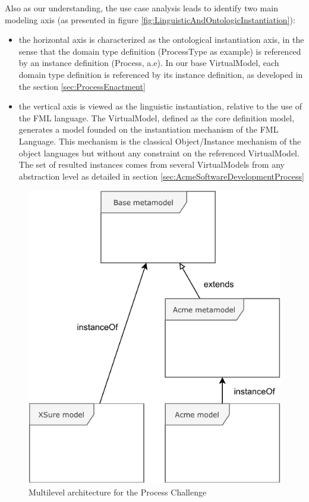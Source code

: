Also as our understanding, the use case analysis leads to identify two main modeling axis (as presented in figure \ref{fig:LinguisticAndOntologicInstantiation}):
\begin{itemize}
    \item the horizontal axis is characterized as the ontological instantiation axis, in the sense that the domain type definition (ProcessType as example) is referenced by an instance definition (Process, a.e). In our base  VirtualModel, each domain type definition is referenced by its instance definition, as developed in the section \ref{sec:ProcessEnactment}

\item the vertical axis is viewed as the linguistic instantiation, relative to the use of the FML language. The VirtualModel, defined as the core definition model, generates a model founded on the instantiation mechanism of the FML Language. This mechanism is the classical Object/Instance mechanism of the object languages but without any constraint on the referenced VirtualModel. The set of resulted instances comes from several VirtualModels 
from any abstraction level as detailed in section \ref{sec:AcmeSoftwareDevelopmentProcess}


\end{itemize}



\begin{figure}
    \centering
    \includegraphics[width=0.7 \columnwidth]{Figures/MultilevelArchitecture.pdf}
    \caption{Multilevel architecture for the Process Challenge}
    \label{fig:MultilevelArchitecture}
\end{figure}



